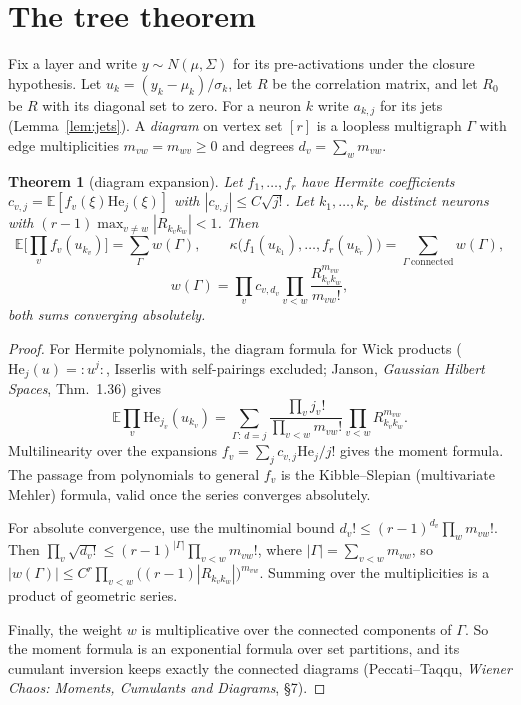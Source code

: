 \documentclass[11pt]{article}
\newtheorem{theorem}{Theorem}[section]
\theoremstyle{definition}
\theoremstyle{remark}
\newcommand{\E}{\mathbb E}
\newcommand{\He}{\mathrm{He}}
\begin{document}
\section{The tree theorem}\label{sec:trees}

Fix a layer and write $y\sim N(\mu,\Sigma)$ for its pre-activations under the closure hypothesis. Let $u_k=(y_k-\mu_k)/\sigma_k$, let $R$ be the correlation matrix, and let $R_0$ be $R$ with its diagonal set to zero. For a neuron $k$ write $a_{k,j}$ for its jets (Lemma~\ref{lem:jets}). A \emph{diagram} on vertex set $[r]$ is a loopless multigraph $\Gamma$ with edge multiplicities $m_{vw}=m_{wv}\ge0$ and degrees $d_v=\sum_wm_{vw}$.

\begin{theorem}[diagram expansion]\label{thm:diagram}
Let $f_1,\dots,f_r$ have Hermite coefficients $c_{v,j}=\E[f_v(\xi)\He_j(\xi)]$ with $|c_{v,j}|\le C\sqrt{j!}$. Let $k_1,\dots,k_r$ be distinct neurons with $(r-1)\max_{v\ne w}|R_{k_vk_w}|<1$. Then
\[
\E\Big[\prod_{v}f_v(u_{k_v})\Big]=\sum_{\Gamma}w(\Gamma),\qquad
\kappa\big(f_1(u_{k_1}),\dots,f_r(u_{k_r})\big)=\sum_{\Gamma\ \mathrm{connected}}w(\Gamma),
\]
\[
w(\Gamma)=\prod_{v}c_{v,d_v}\prod_{v<w}\frac{R_{k_vk_w}^{m_{vw}}}{m_{vw}!},
\]
both sums converging absolutely.
\end{theorem}

\begin{proof}
For Hermite polynomials, the diagram formula for Wick products ($\He_j(u)={:}u^j{:}$, Isserlis with self-pairings excluded; Janson, \emph{Gaussian Hilbert Spaces}, Thm.~1.36) gives
\[
\E\prod_v\He_{j_v}(u_{k_v})=\sum_{\Gamma:\,d=j}\frac{\prod_vj_v!}{\prod_{v<w}m_{vw}!}\prod_{v<w}R^{m_{vw}}_{k_vk_w}.
\]
Multilinearity over the expansions $f_v=\sum_jc_{v,j}\He_j/j!$ gives the moment formula. The passage from polynomials to general $f_v$ is the Kibble--Slepian (multivariate Mehler) formula, valid once the series converges absolutely.

For absolute convergence, use the multinomial bound $d_v!\le(r-1)^{d_v}\prod_wm_{vw}!$. Then $\prod_v\sqrt{d_v!}\le(r-1)^{|\Gamma|}\prod_{v<w}m_{vw}!$, where $|\Gamma|=\sum_{v<w}m_{vw}$, so $|w(\Gamma)|\le C^r\prod_{v<w}\big((r-1)|R_{k_vk_w}|\big)^{m_{vw}}$. Summing over the multiplicities is a product of geometric series.

Finally, the weight $w$ is multiplicative over the connected components of $\Gamma$. So the moment formula is an exponential formula over set partitions, and its cumulant inversion keeps exactly the connected diagrams (Peccati--Taqqu, \emph{Wiener Chaos: Moments, Cumulants and Diagrams}, \S7).
\end{proof}
\end{document}
